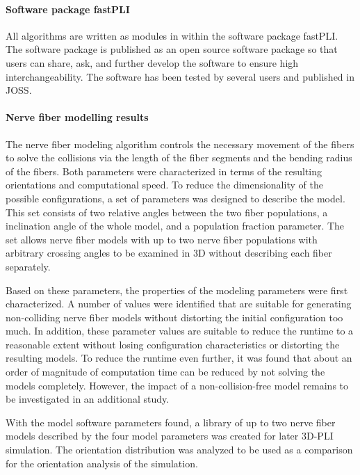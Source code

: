 \paragraph{Software package \acs{fastPLI}}
% 
All algorithms are written as modules in \python{} within the software package \ac{fastPLI}.
The software package is published as an open source software package so that users can share, ask, and further develop the software to ensure high interchangeability. 
The software has been tested by several users and published in \ac{JOSS}.
% 
% 
% 
\paragraph{Nerve fiber modelling results}
% 
The nerve fiber modeling algorithm controls the necessary movement of the fibers to solve the collisions via the length of the fiber segments and the bending radius of the fibers.
Both parameters were characterized in terms of the resulting orientations and computational speed.
To reduce the dimensionality of the possible configurations, a set of parameters was designed to describe the model.
This set consists of two relative angles between the two fiber populations, a inclination angle of the whole model, and a population fraction parameter.
The set allows nerve fiber models with up to two nerve fiber populations with arbitrary crossing angles to be examined in 3D without describing each fiber separately.
\par
% 
Based on these parameters, the properties of the modeling parameters were first characterized.
A number of values were identified that are suitable for generating non-colliding nerve fiber models without distorting the initial configuration too much.
In addition, these parameter values are suitable to reduce the runtime to a reasonable extent without losing configuration characteristics or distorting the resulting models.
To reduce the runtime even further, it was found that about an order of magnitude of computation time can be reduced by not solving the models completely.
However, the impact of a non-collision-free model remains to be investigated in an additional study.
\par
% 
With the model software parameters found, a library of up to two nerve fiber models described by the four model parameters was created for later \ac{3D-PLI} simulation.
The orientation distribution was analyzed to be used as a comparison for the orientation analysis of the simulation.
% 
% 
% 
